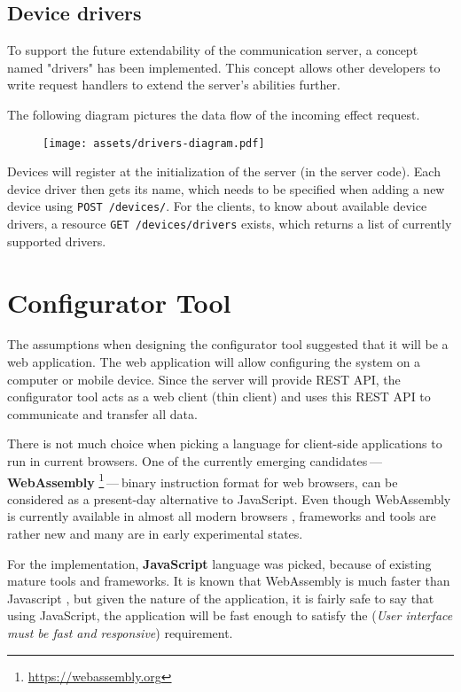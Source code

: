 \hypertarget{x-device-drivers}{\subsection{Device drivers}}
To support the future extendability of the communication server, a concept named
"drivers" has been implemented. This concept allows other developers to write
request handlers to extend the server’s abilities further.


The following diagram pictures the data flow of the incoming effect request.


\begin{figure}[h]{}
\centering\texttt{[image: assets/drivers-diagram.pdf]}
\caption{}

\end{figure}

Devices will register at the initialization of the server (in the server code).
Each device driver then gets its name, which needs to be specified when adding a new
device using \texttt{POST /devices/}. For the clients, to know about available device
drivers, a resource \texttt{GET /devices/drivers} exists, which returns a list
of currently supported drivers.


\hypertarget{x-configurator-tool}{\section{Configurator Tool}}
The assumptions when designing the configurator tool suggested that it will
be a web application. The web application will allow configuring the system
on a computer or mobile device. Since the server will provide REST API,
the configurator tool acts as a
web client (thin client) and uses this REST API to communicate and transfer
all data.


There is not much choice when picking a language for client-side applications
to run in current browsers. One of the currently
emerging candidates — \textbf{WebAssembly} \footnote{\href{https://webassembly.org}{https://webassembly.org}} — binary instruction format for web browsers, can be considered as
a present-day alternative to JavaScript. Even though WebAssembly is
currently available in almost all modern browsers \hyperlink{wasmroadmap}{}, frameworks
and tools are rather new and many are in early experimental states.


For the implementation, \textbf{JavaScript} language was picked, because
of existing mature tools and frameworks. It is known that WebAssembly
is much faster than Javascript \hyperlink{wasmfast}{}, but given the nature of the
application, it is fairly safe to say that using JavaScript, the application
will be fast enough to satisfy the \hyperlink{./05-analysis}{}
(\emph{User interface must be fast and responsive})
requirement.


